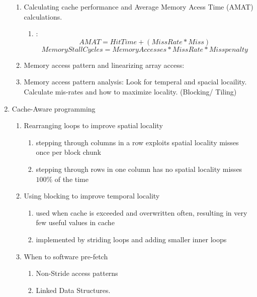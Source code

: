 \documentclass[12pt]{article}
\renewcommand{\=}[1]{\stackrel{#1}{=}} %
\theoremstyle{definition}
\theoremstyle{remark}
\begin{document}
\begin{enumerate}
\begin{enumerate}
    \item Calculating cache performance and Average Memory Acess Time (AMAT) calculations.
      \begin{enumerate}
      \item :
        \begin{equation}
          \label{eq: AMAT}
          AMAT = HitTime + (MissRate * Miss) 
        \end{equation}
        \begin{equation}
          MemoryStallCycles = MemoryAccesses * MissRate * Miss penalty
        \end{equation}
      \end{enumerate}
    \item Memory access pattern and linearizing array access: 
    \item Memory access pattern analysis: Look for temperal and
      spacial locaility. Calculate mis-rates and how to maximize
      locality. (Blocking/ Tiling)
    \end{enumerate}
  \item Cache-Aware programming
    \begin{enumerate}
    \item Rearranging loops to improve spatial locality
      \begin{enumerate}
      \item stepping through columns in a row exploits spatial locality
        misses once per block chunk
      \item stepping through rows in one column has no spatial locality
        misses $100\%$ of the time
      \end{enumerate}

    \item Using blocking to improve temporal locality
      \begin{enumerate}
      \item used when cache is exceeded and overwritten often, resulting in very few useful values in cache
      \item implemented by striding loops and adding smaller inner loops
      \end{enumerate}

    \item When to software pre-fetch
      \begin{enumerate}
      \item Non-Stride access patterns
      \item Linked Data Structures.
      \end{enumerate}


\end{enumerate}
\end{enumerate}
\end{document}
